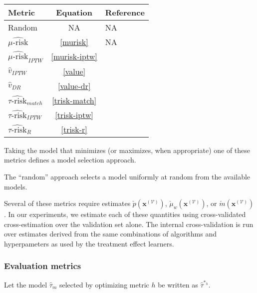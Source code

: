
\begin{center}
\tabulinesep=1mm
\begin{tabu}{|l|c|l|}
	\hline
	 \rowfont[c]{\bfseries} Metric & Equation &  Reference \\
	 \hline
	 Random 						& NA  			& NA \\
	 $\widehat{\mu\text{-risk}}$		& \ref{murisk}  		& NA \\
	 $\widehat{\mu\text{-risk}}_{IPTW}$	& \ref{murisk-iptw} 	& \citet{VanderLaan:2003ir} \\
	 $\hat v_{IPTW}$ 				& \ref{value}  		& \citet{Zhao:2017wa} \\
	 $\hat v_{DR}$					& \ref{value-dr}		& \citet{Athey:wj}  \\
	 $\widehat{\tau\text{-risk}}_{match}$	& \ref{trisk-match}	& \citet{Rolling:2013kz} \\
	 $\widehat{\tau\text{-risk}}_{IPTW}$ 	& \ref{trisk-iptw} 	& \citet{Gutierrez:2016tq} \\
	 $\widehat{\tau\text{-risk}}_{R}$		& \ref{trisk-r} 		& \citet{Nie:2017vi} \\
	 \hline
\end{tabu}
\label{metric-table}
\end{center}

Taking the model that minimizes (or maximizes, when appropriate) one of these metrics defines a model selection approach. 

The ``random'' approach selects a model uniformly at random from the available models. 

Several of these metrics require estimates $\check p(\bm x^{(\mathcal V)})$, $\check \mu_w(\bm x^{(\mathcal V)})$, or $\check m(\bm x^{(\mathcal V)})$. In our experiments, we estimate each of these quantities using cross-validated cross-estimation over the validation set alone. The internal cross-validation is run over estimates derived from the same combinations of algorithms and hyperpameters as used by the treatment effect learners. 

\subsubsection{Evaluation metrics}

Let the model $\hat\tau_m$ selected by optimizing metric $h$ be written as $\hat\tau^{*_h}$. 

